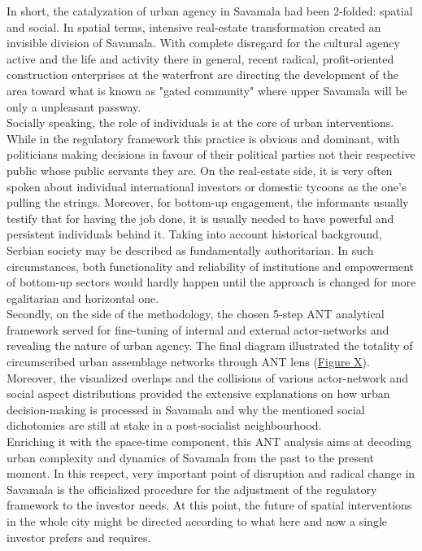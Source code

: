 \documentclass[11pt]{report}
\begin{document}
In short, the catalyzation of urban agency in Savamala had been 2-folded: spatial and social.
In spatial terms, intensive real-estate transformation created an invisible division of Savamala. With complete disregard for the cultural agency active and the life and activity there in general, recent radical, profit-oriented construction enterprises at the waterfront are directing the development of the area toward what is known as "gated community" where upper Savamala will be only a unpleasant passway.
\\

Socially speaking, the role of individuals is at the core of urban interventions.
While in the regulatory framework this practice is obvious and dominant, with politicians making decisions in favour of their political parties not their respective public whose public servants they are.
On the real-estate side, it is very often spoken about individual international investors or domestic tycoons as the one's pulling the strings.
Moreover, for bottom-up engagement, the informants usually testify that for having the job done, it is usually needed to have powerful and persistent individuals behind it.
Taking into account historical background, Serbian society may be described as fundamentally authoritarian.
In such circumstances, both functionality and reliability of institutions and empowerment of bottom-up sectors would hardly happen until the approach is changed for more egalitarian and horizontal one. 
\\

Secondly, on the side of the methodology, the chosen 5-step ANT analytical framework served for fine-tuning of internal and external actor-networks and revealing the nature of urban agency.
The final diagram illustrated the totality of circumscribed urban assemblage networks through ANT lens (\href{ref}{Figure X}).
Moreover, the visualized overlaps and the collisions of various actor-network and social aspect distributions provided the extensive explanations on how urban decision-making is processed in Savamala and why the mentioned social dichotomies are still at stake in a post-socialist neighbourhood.
\\

Enriching it with the space-time component, this ANT analysis aims at decoding urban complexity and dynamics of Savamala from the past to the present moment.
In this respect, very important point of disruption and radical change in Savamala is the officialized procedure for the adjustment of the regulatory framework to the investor needs.
At this point, the future of spatial interventions in the whole city might be directed according to what here and now a single investor prefers and requires. 
\\
\end{document}
